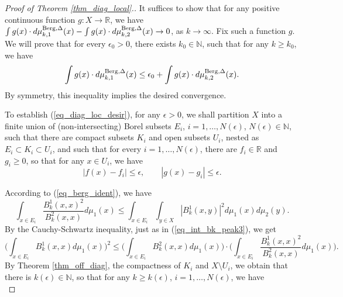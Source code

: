 \documentclass[12pt]{article}
\numberwithin{equation}{section}
\theoremstyle{theorem}
\theoremstyle{definition}
\theoremstyle{remark}
\newcommand{\real}{\mathbb{R}}
\newcommand{\nat}{\mathbb{N}}
\begin{document}
	\begin{proof}[Proof of Theorem \ref{thm_diag_local}.]
		It suffices to show that for any positive continuous function $g: X \to \real$, we have $\int g(x) \cdot d \mu_{k, 1}^{\rm{Berg}, \Delta}(x) - \int g(x) \cdot d \mu_{k, 2}^{\rm{Berg}, \Delta}(x) \to 0$, as $k \to \infty$.
		Fix such a function $g$.
		We will prove that for every $\epsilon_0 > 0$, there exists $k_0 \in \nat$, such that for any $k \geq k_0$, we have
		\begin{equation}\label{eq_diag_loc_desir}
			\int g(x) \cdot d \mu_{k, 1}^{\rm{Berg}, \Delta}(x)
			\leq
			\epsilon_0 + 
			\int g(x) \cdot d \mu_{k, 2}^{\rm{Berg}, \Delta}(x).
		\end{equation}
		By symmetry, this inequality implies the desired convergence.
		\par 
		To establish (\ref{eq_diag_loc_desir}), for any $\epsilon > 0$, we shall partition $X$ into a finite union of (non-intersecting) Borel subsets $E_i$, $i = 1, \ldots, N(\epsilon)$, $N(\epsilon) \in \nat$, such that there are compact subsets $K_i$ and open subsets $U_i$, nested as $E_i \subset K_i \subset U_i$, and such that for every $i = 1, \ldots, N(\epsilon)$, there are $f_i \in \real$ and $g_i \geq 0$, so that for any $x \in U_i$, we have 
		\begin{equation}\label{eq_thm_diag_local1}
			|f(x) - f_i| \leq \epsilon, \qquad |g(x) - g_i| \leq \epsilon.
		\end{equation}
		\par 
		According to (\ref{eq_berg_ident}), we have
		\begin{equation}\label{eq_thm_diag_local2}
			\int_{x \in E_i} \frac{B^1_k(x, x)^2}{B^2_k(x, x)}  d \mu_1(x)
			\leq
			\int_{x \in E_i} \int_{y \in X} |B^1_k(x, y)|^2 d \mu_1(x) d \mu_2(y).
		\end{equation}
		By the Cauchy-Schwartz inequality, just as in (\ref{eq_int_bk_peak3}), we get
		\begin{equation}\label{eq_thm_diag_local3}
			\Big( \int_{x \in E_i} B^1_k(x, x)  d \mu_1(x) \Big)^2 \leq \Big( \int_{x \in E_i} B^2_k(x, x)  d \mu_1(x) \Big) \cdot \Big( \int_{x \in E_i} \frac{B^1_k(x, x)^2}{B^2_k(x, x)}  d \mu_1(x) \Big).
		\end{equation}
		By Theorem \ref{thm_off_diag}, the compactness of $K_i$ and $X \setminus U_i$, we obtain that there is $k(\epsilon) \in \nat$, so that for any $k \geq k(\epsilon)$, $i = 1, \ldots, N(\epsilon)$, we have
		\begin{equation}\label{eq_thm_diag_local4}

\end{equation}
\end{proof}
\end{document}
